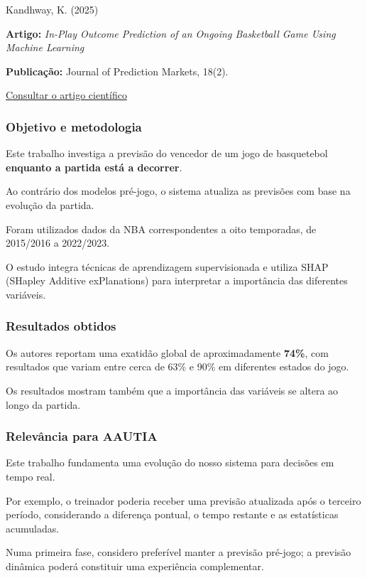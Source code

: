 Kandhway, K. (2025) \cite{kandhway2025}

\textbf{Artigo:} \emph{In-Play Outcome Prediction of an Ongoing Basketball Game Using Machine Learning}

\textbf{Publicação:} Journal of Prediction Markets, 18(2).

\href{https://doi.org/10.5750/jpm.v18i2.2155}{Consultar o artigo científico}

\subsubsection{Objetivo e metodologia}\label{aautia:objetivo-e-metodologia-3}

Este trabalho investiga a previsão do vencedor de um jogo de basquetebol \textbf{enquanto a partida está a decorrer}.

Ao contrário dos modelos pré-jogo, o sistema atualiza as previsões com base na evolução da partida.

Foram utilizados dados da NBA correspondentes a oito temporadas, de 2015/2016 a 2022/2023.

O estudo integra técnicas de aprendizagem supervisionada e utiliza SHAP (SHapley Additive exPlanations) para interpretar a importância das diferentes variáveis.

\subsubsection{Resultados obtidos}\label{aautia:resultados-obtidos-1}

Os autores reportam uma exatidão global de aproximadamente \textbf{74\%}, com resultados que variam entre cerca de 63\% e 90\% em diferentes estados do jogo.

Os resultados mostram também que a importância das variáveis se altera ao longo da partida.

\subsubsection{Relevância para AAUTIA}\label{aautia:relevuxe2ncia-para-aautia-3}

Este trabalho fundamenta uma evolução do nosso sistema para decisões em tempo real.

Por exemplo, o treinador poderia receber uma previsão atualizada após o terceiro período, considerando a diferença pontual, o tempo restante e as estatísticas acumuladas.

Numa primeira fase, considero preferível manter a previsão pré-jogo; a previsão dinâmica poderá constituir uma experiência complementar.

